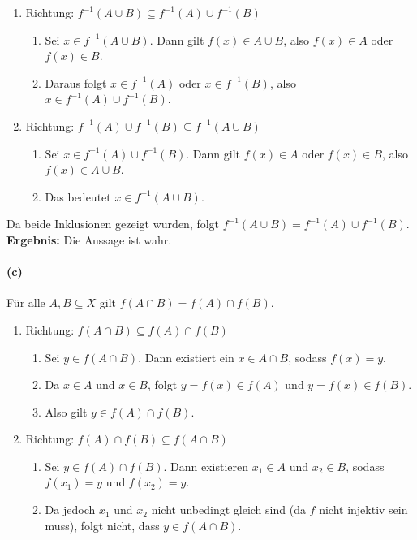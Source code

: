 \documentclass[12pt, letterpaper]{article}
\begin{document}
\begin{enumerate}
    \item Richtung: $f^{-1}(A \cup B) \subseteq f^{-1}(A) \cup f^{-1}(B)$
        \begin{enumerate}[label=$\circ$]
            \item Sei $x \in f^{-1}(A \cup B)$. Dann gilt $f(x) \in A \cup B$, also $f(x) \in A$ oder $f(x) \in B$.
            \item Daraus folgt $x \in f^{-1}(A)$ oder $x \in f^{-1}(B)$, also $x \in f^{-1}(A) \cup f^{-1}(B)$.
        \end{enumerate}
    \item Richtung: $f^{-1}(A) \cup f^{-1}(B) \subseteq f^{-1}(A \cup B)$
        \begin{enumerate}[label=$\circ$]
            \item Sei $x \in f^{-1}(A) \cup f^{-1}(B)$. Dann gilt $f(x) \in A$ oder $f(x) \in B$, also $f(x) \in A \cup B$.
            \item Das bedeutet $x \in f^{-1}(A \cup B)$.
        \end{enumerate}
\end{enumerate}

\noindent Da beide Inklusionen gezeigt wurden, folgt $f^{-1}(A \cup B) = f^{-1}(A) \cup f^{-1}(B)$. \\

\noindent\textbf{Ergebnis:} Die Aussage ist wahr.\\

\paragraph{(c)} Für alle $A, B \subseteq X$ gilt $f(A \cap B) = f(A) \cap f(B)$.

\begin{enumerate}
    \item Richtung: $f(A \cap B) \subseteq f(A) \cap f(B)$
        \begin{enumerate}[label=$\circ$]
            \item Sei $y \in f(A \cap B)$. Dann existiert ein $x \in A \cap B$, sodass $f(x) = y$. 
            \item Da $x \in A$ und $x \in B$, folgt $y = f(x) \in f(A)$ und $y = f(x) \in f(B)$.
            \item Also gilt $y \in f(A) \cap f(B)$.
        \end{enumerate}
    \item Richtung: $f(A) \cap f(B) \subseteq f(A \cap B)$
        \begin{enumerate}[label=$\circ$]
            \item Sei $y \in f(A) \cap f(B)$. Dann existieren $x_1 \in A$ und $x_2 \in B$, sodass $f(x_1) = y$ und $f(x_2) = y$.
            \item Da jedoch $x_1$ und $x_2$ nicht unbedingt gleich sind (da $f$ nicht injektiv sein muss), folgt nicht, dass $y \in f(A \cap B)$.
        \end{enumerate}
\end{enumerate}
\end{document}
